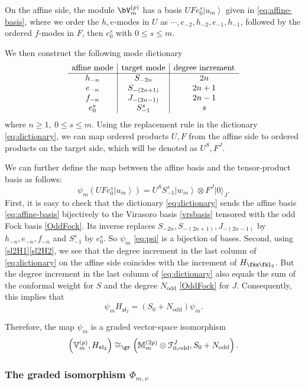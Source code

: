 \documentclass[a4paper,11pt]{article}
\theoremstyle{definition}
\theoremstyle{definition}
\theoremstyle{remark}
\newcommand{\ket}[1]{\ensuremath{\left|#1\right\rangle}}
\newcommand{\be}{\begin{equation}}
\newcommand{\ee}{\end{equation}}
\begin{document}
On  the affine side, the module $\bV_m^{(p)}$ has a basis 
$ UF e_0^s\ket{u_m} $ given in  \eqref{eq:affine-basis},
where we order the $h,e$-modes in $U$ as
$\cdots,e_{-2},h_{-2},e_{-1},h_{-1}$, followed by the ordered
$f$-modes in $F$, then $e_0^s$ with $0\leq s\leq m$. 

We then construct the following mode dictionary  
 \be 
\begin{array}{c|c|c}\centering
\text{affine mode}&\text{target mode}&\text{degree increment}\\\hline
h_{-n}&S_{-2n}&2n\\
e_{-n}&S_{-(2n+1)}&2n+1\\
f_{-n}&J_{-(2n-1)}&2n-1\\
e_0^s&S_{-1}^s&s 
\end{array} 
\label{eq:dictionary}
\ee
 where $n\geq1,\ 0\leq s\leq m$.
 Using the replacement rule in the  dictionary \eqref{eq:dictionary}, we   can map ordered products $U,F$ from the affine side to ordered products on  the target side,  which will be denoted as $U^S,F^J$. 

We can further define the map between  the affine basis and the tensor-product basis as follows:
\be
\psi_m(UF e_0^s\ket{u_m})
=U^SS_{-1}^s\ket{w_m}\otimes F^J|0\rangle_J.
\label{eq:psi}
\ee
First, it is easy to check that the dictionary  \eqref{eq:dictionary} sends the affine basis \eqref{eq:affine-basis}
bijectively to the Virasoro basis \eqref{vrsbasis} tensored
with the odd Fock basis \eqref{OddFock}.  Its inverse replaces
$S_{-2n},S_{-(2n+1)},J_{-(2n-1)}$ by
$h_{-n},e_{-n},f_{-n}$ and   $S_{-1}^s$ by $e_0^s$. So $\psi_m$ \eqref{eq:psi} is a bijection of bases. 
Second, using \eqref{sl2H1}\eqref{sl2H2}, we see that the degree increment in the last column of \eqref{eq:dictionary}  on the affine side coincides with the increment of $H_{\fks\fkl_2}$. But the degree increment in the last column of \eqref{eq:dictionary}  also equals  the  sum of the conformal weight for $S$ and the degree $N_\text{odd}$ \eqref{OddFock} for $J$. Consequently, this implies that 
\be 
\psi_mH_{\mathfrak{sl}_2}
=(S_0+N_{\mathrm{odd}})\psi_m.
\label{eq:psi-grading}
\ee

Therefore, the map $\psi_m$ is a graded vector-space isomorphism
\be
\left(\mathbb V_m^{(p)},H_{\mathfrak{sl}_2}\right)
\cong_{\gr}
\left(\mathbb M_m^{(2p)}\otimes\mathcal F^J_{0,\mathrm{odd}},
S_0+N_{\mathrm{odd}}\right).
\label{eq:m-isomorphism}
\ee   


 
\subsubsection{The graded isomorphism $ \Phi_{m,\nu} $}\label{Phimusec}
\end{document}
